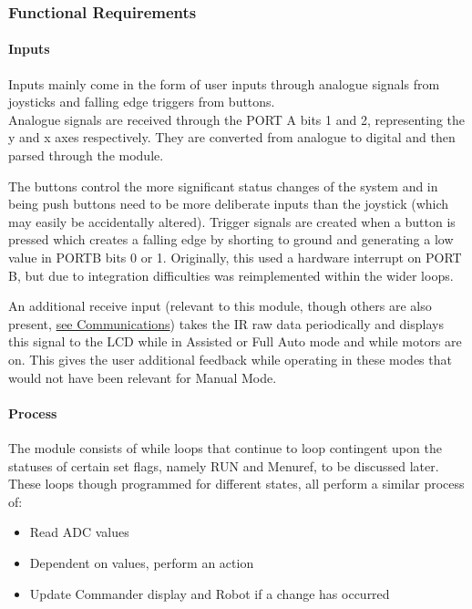 \documentclass[MTRX3700report.tex]{subfiles}
\begin{document}
	\subsubsection{Functional Requirements}
	\paragraph{Inputs}
	Inputs mainly come in the form of user inputs through analogue signals from joysticks and falling edge triggers from buttons.\\
	 
	Analogue signals are received through the PORT A bits 1 and 2, representing the y and x axes respectively. They are converted from analogue to digital and then parsed through the module.
	
	The buttons control the more significant status changes of the system and in being push buttons need to be more deliberate inputs than the joystick (which may easily be accidentally altered). Trigger signals are created when a button is pressed which creates a falling edge by shorting to ground and generating a low value in PORTB bits 0 or 1. Originally, this used a hardware interrupt on PORT B, but due to integration difficulties was reimplemented within the wider loops.
	
	An additional receive input (relevant to this module, though others are also present, \underline{see Communications}) takes the IR raw data periodically and displays this signal to the LCD while in Assisted or Full Auto mode and while motors are on. This gives the user additional feedback while operating in these modes that would not have been relevant for Manual Mode. 
	
	
	\paragraph{Process}
		
	The module consists of while loops that continue to loop contingent upon the statuses of certain set flags, namely RUN and Menu\textunderscore ref, to be discussed later. These loops though programmed for different states, all perform a similar process of:
	\begin{itemize}
		\item Read ADC values
		\item Dependent on values, perform an action
		\item Update Commander display and Robot if a change has occurred
	\end{itemize}
	
\end{document}
